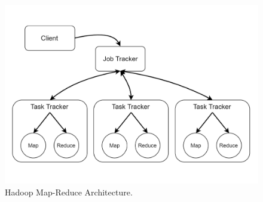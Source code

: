 \begin{figure}
	\centering
	\includegraphics[width=\columnwidth]{Images/hadoop_map_reduce_architecture.pdf}  
	\caption[hadoop map-reduce architecture]{Hadoop Map-Reduce Architecture.}
	\label{fig:hadoopMapReduceArchitecture}
\end{figure}

